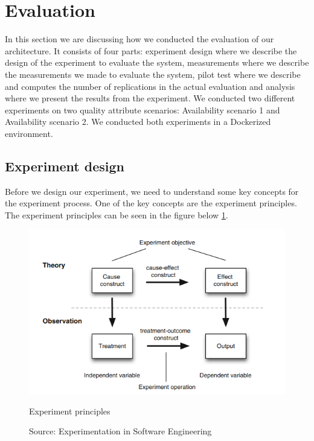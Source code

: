\section{Evaluation}
\label{sec:evaluation}

In this section we are discussing how we conducted the evaluation of our architecture. It consists of four parts: experiment design where we describe the design of the experiment to evaluate the system, measurements where we describe the measurements we made to evaluate the system, pilot test where we describe and computes the number of replications in the actual evaluation and analysis where we present the results from the experiment. We conducted two different experiments on two quality attribute scenarios: Availability scenario 1 and Availability scenario 2. We conducted both experiments in a Dockerized environment.

\subsection{Experiment design}
\label{sec:design}
Before we design our experiment, we need to understand some key concepts for the experiment process. One of the key concepts are the experiment principles. The experiment principles can be seen in the figure below \ref{fig:experiment_principles}.

\begin{figure}[h]
\centering
  \includegraphics[width=\linewidth]{images/experiment_principles.png}
  \caption{Experiment principles}
  \caption*{Source: Experimentation in Software Engineering}
  \cite{experimentationInSoftwareEngineering}
  \label{fig:experiment_principles}
\end{figure}

